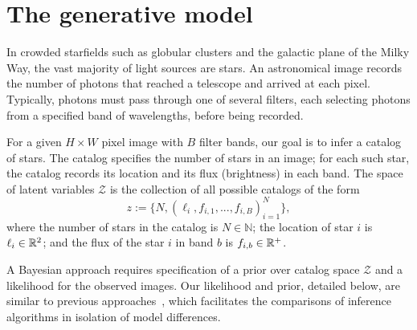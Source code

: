 \section{The generative model}
\label{sec:gen_model}

In crowded starfields such as globular clusters and the galactic plane of the Milky Way, the vast majority of light sources are stars.
An astronomical image records the number of photons that reached a telescope and arrived at each pixel.
Typically, photons must pass through one of several filters, each selecting photons from a specified band of wavelengths, before being recorded.

For a given $H \times W$ pixel image with $B$ filter bands, our goal is to infer a catalog of
stars.
The catalog specifies the number of stars
in an image; for each such star, the catalog
records its location and its flux (brightness)
in each band.
The space of latent variables
$\mathcal{Z}$ is the collection of all possible catalogs of the form
\[z := \{N, (\ell_i, f_{i,1}, ..., f_{i,B})_{i = 1}^N\},\]
where the number of stars in the catalog
is $N\in\mathbb{N}$;
the location of star $i$ is $\ell_i \in \mathbb{R}^2$; and
the flux of the star $i$ in band $b$ is $f_{i, b}\in\mathbb{R}^+$.

A Bayesian approach requires specification of a prior over catalog space $\mathcal{Z}$ and a likelihood for the observed images. Our likelihood and prior, detailed below, are similar to previous approaches~\citep{Brewer_2013, Portillo_2017, Feder_2019}, 
which facilitates the comparisons of inference algorithms in isolation of model differences. 

